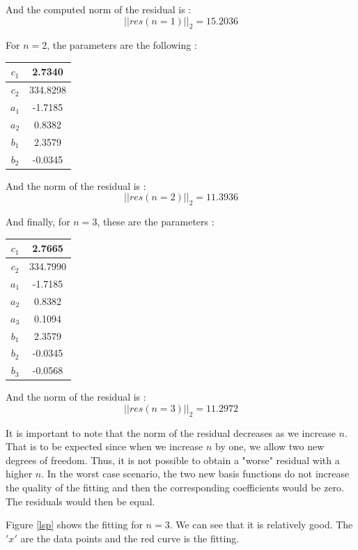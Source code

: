 And the computed norm of the residual is :
$$||res(n=1)||_2=15.2036$$

For $n=2$, the parameters are the following : 

\begin{center}
\begin{tabular}{|c|c|}
\hline 
$c_1$ & 2.7340 \\ 
\hline 
$c_2$ & 334.8298 \\ 
\hline 
$a_1$ & -1.7185 \\ 
\hline 
$a_2$ & 0.8382 \\
\hline
$b_1$ & 2.3579 \\ 
\hline 
$b_2$ & -0.0345\\
\hline
\end{tabular} 
\end{center}

And the norm of the residual is :
$$||res(n=2)||_2=11.3936$$

And finally, for $n=3$, these are the parameters : 

\begin{center}
\begin{tabular}{|c|c|}
\hline 
$c_1$ & 2.7665 \\ 
\hline 
$c_2$ & 334.7990 \\ 
\hline 
$a_1$ & -1.7185 \\ 
\hline 
$a_2$ & 0.8382 \\
\hline
$a_3$ & 0.1094\\
\hline
$b_1$ & 2.3579 \\ 
\hline 
$b_2$ & -0.0345\\
\hline
$b_3$ & -0.0568\\
\hline
\end{tabular} 
\end{center}

And the norm of the residual is :
$$||res(n=3)||_2=11.2972$$

It is important to note that the norm of the residual decreases as we increase $n$. That is to be expected since when we increase $n$ by one, we allow two new degrees of freedom. Thus, it is not possible to obtain a "worse" residual with a higher $n$. In the worst case scenario, the two new basis functions do not increase the quality of the fitting and then the corresponding coefficients would be zero. The residuals would then be equal.

Figure \ref{lsp} shows the fitting for $n=3$. We can see that it is relatively good. The $'x'$ are the data points and the red curve is the fitting.

